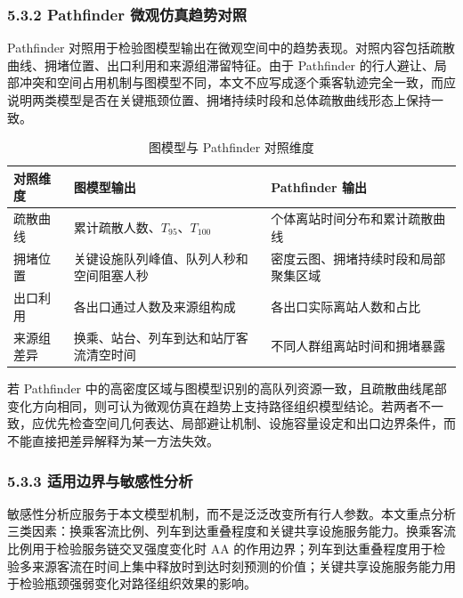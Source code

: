 \documentclass[UTF8,a4paper,12pt]{ctexart}
\begin{document}
\subsubsection{5.3.2 Pathfinder 微观仿真趋势对照}

Pathfinder 对照用于检验图模型输出在微观空间中的趋势表现。对照内容包括疏散曲线、拥堵位置、出口利用和来源组滞留特征。由于 Pathfinder 的行人避让、局部冲突和空间占用机制与图模型不同，本文不应写成逐个乘客轨迹完全一致，而应说明两类模型是否在关键瓶颈位置、拥堵持续时段和总体疏散曲线形态上保持一致。

\begin{table}[htbp]
\centering
\caption{图模型与 Pathfinder 对照维度}
\small
\begin{tabular}{p{}p{}p{}}
\toprule
对照维度 & 图模型输出 & Pathfinder 输出 \\
\midrule
疏散曲线 & 累计疏散人数、\(T_{95}\)、\(T_{100}\) & 个体离站时间分布和累计疏散曲线 \\
拥堵位置 & 关键设施队列峰值、队列人秒和空间阻塞人秒 & 密度云图、拥堵持续时段和局部聚集区域 \\
出口利用 & 各出口通过人数及来源组构成 & 各出口实际离站人数和占比 \\
来源组差异 & 换乘、站台、列车到达和站厅客流清空时间 & 不同人群组离站时间和拥堵暴露 \\
\bottomrule
\end{tabular}
\end{table}

若 Pathfinder 中的高密度区域与图模型识别的高队列资源一致，且疏散曲线尾部变化方向相同，则可认为微观仿真在趋势上支持路径组织模型结论。若两者不一致，应优先检查空间几何表达、局部避让机制、设施容量设定和出口边界条件，而不能直接把差异解释为某一方法失效。

\subsubsection{5.3.3 适用边界与敏感性分析}

敏感性分析应服务于本文模型机制，而不是泛泛改变所有行人参数。本文重点分析三类因素：换乘客流比例、列车到达重叠程度和关键共享设施服务能力。换乘客流比例用于检验服务链交叉强度变化时 AA 的作用边界；列车到达重叠程度用于检验多来源客流在时间上集中释放时到达时刻预测的价值；关键共享设施服务能力用于检验瓶颈强弱变化对路径组织效果的影响。
\end{document}
